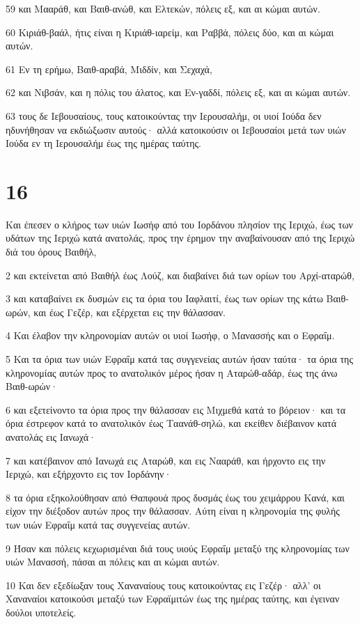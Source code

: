 \par 59 και Μααράθ, και Βαιθ-ανώθ, και Ελτεκών, πόλεις εξ, και αι κώμαι αυτών.
\par 60 Κιριάθ-βαάλ, ήτις είναι η Κιριάθ-ιαρείμ, και Ραββά, πόλεις δύο, και αι κώμαι αυτών.
\par 61 Εν τη ερήμω, Βαιθ-αραβά, Μιδδίν, και Σεχαχά,
\par 62 και Νιβσάν, και η πόλις του άλατος, και Εν-γαδδί, πόλεις εξ, και αι κώμαι αυτών.
\par 63 τους δε Ιεβουσαίους, τους κατοικούντας την Ιερουσαλήμ, οι υιοί Ιούδα δεν ηδυνήθησαν να εκδιώξωσιν αυτούς· αλλά κατοικούσιν οι Ιεβουσαίοι μετά των υιών Ιούδα εν τη Ιερουσαλήμ έως της ημέρας ταύτης.

\chapter{16}

\par Και έπεσεν ο κλήρος των υιών Ιωσήφ από του Ιορδάνου πλησίον της Ιεριχώ, έως των υδάτων της Ιεριχώ κατά ανατολάς, προς την έρημον την αναβαίνουσαν από της Ιεριχώ διά του όρους Βαιθήλ,
\par 2 και εκτείνεται από Βαιθήλ έως Λούζ, και διαβαίνει διά των ορίων του Αρχί-αταρώθ,
\par 3 και καταβαίνει εκ δυσμών εις τα όρια του Ιαφλαιτί, έως των ορίων της κάτω Βαιθ-ωρών, και έως Γεζέρ, και εξέρχεται εις την θάλασσαν.
\par 4 Και έλαβον την κληρονομίαν αυτών οι υιοί Ιωσήφ, ο Μανασσής και ο Εφραΐμ.
\par 5 Και τα όρια των υιών Εφραΐμ κατά τας συγγενείας αυτών ήσαν ταύτα· τα όρια της κληρονομίας αυτών προς το ανατολικόν μέρος ήσαν η Αταρώθ-αδάρ, έως της άνω Βαιθ-ωρών·
\par 6 και εξετείνοντο τα όρια προς την θάλασσαν εις Μιχμεθά κατά το βόρειον· και τα όρια έστρεφον κατά το ανατολικόν έως Ταανάθ-σηλώ, και εκείθεν διέβαινον κατά ανατολάς εις Ιανωχά·
\par 7 και κατέβαινον από Ιανωχά εις Αταρώθ, και εις Νααράθ, και ήρχοντο εις την Ιεριχώ, και εξήρχοντο εις τον Ιορδάνην·
\par 8 τα όρια εξηκολούθησαν από Θαπφουά προς δυσμάς έως του χειμάρρου Κανά, και είχον την διέξοδον αυτών προς την θάλασσαν. Αύτη είναι η κληρονομία της φυλής των υιών Εφραΐμ κατά τας συγγενείας αυτών.
\par 9 Ήσαν και πόλεις κεχωρισμέναι διά τους υιούς Εφραΐμ μεταξύ της κληρονομίας των υιών Μανασσή, πάσαι αι πόλεις και αι κώμαι αυτών.
\par 10 Και δεν εξεδίωξαν τους Χαναναίους τους κατοικούντας εις Γεζέρ· αλλ' οι Χαναναίοι κατοικούσι μεταξύ των Εφραϊμιτών έως της ημέρας ταύτης, και έγειναν δούλοι υποτελείς.

